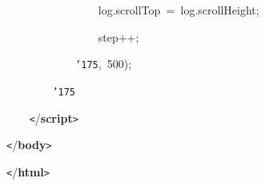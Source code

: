 \documentclass[a4paper,10pt]{article}
\def\mc{\relax}
\begin{document}
\noindent
\mbox{}{\tt\mc \ }{\tt\mc \ }{\tt\mc \ }{\tt\mc \ }{\tt\mc \ }{\tt\mc \ }{\tt\mc \ }{\tt\mc \ }{\tt\mc \ }{\tt\mc \ }{\tt\mc \ }{\tt\mc \ }{\tt\mc \ }{\tt\mc \ }{\tt\mc \ }{\tt\mc \ }log.scrollTop{\tt\mc \ }={\tt\mc \ }log.scrollHeight;

\noindent
\mbox{}{\tt\mc \ }{\tt\mc \ }{\tt\mc \ }{\tt\mc \ }{\tt\mc \ }{\tt\mc \ }{\tt\mc \ }{\tt\mc \ }{\tt\mc \ }{\tt\mc \ }{\tt\mc \ }{\tt\mc \ }{\tt\mc \ }{\tt\mc \ }{\tt\mc \ }{\tt\mc \ }step++;

\noindent
\mbox{}{\tt\mc \ }{\tt\mc \ }{\tt\mc \ }{\tt\mc \ }{\tt\mc \ }{\tt\mc \ }{\tt\mc \ }{\tt\mc \ }{\tt\mc \ }{\tt\mc \ }{\tt\mc \ }{\tt\mc \ }{\tt\char'175},{\tt\mc \ }500);

\noindent
\mbox{}{\tt\mc \ }{\tt\mc \ }{\tt\mc \ }{\tt\mc \ }{\tt\mc \ }{\tt\mc \ }{\tt\mc \ }{\tt\mc \ }{\tt\char'175}

\noindent
\mbox{}{\tt\mc \ }{\tt\mc \ }{\tt\mc \ }{\tt\mc \ }{\tt <}/\textbf{script}{\tt >}

\noindent
\mbox{}{\tt <}/\textbf{body}{\tt >}

\noindent
\mbox{}{\tt <}/\textbf{html}{\tt >}

\rm\mc
\end{document}

